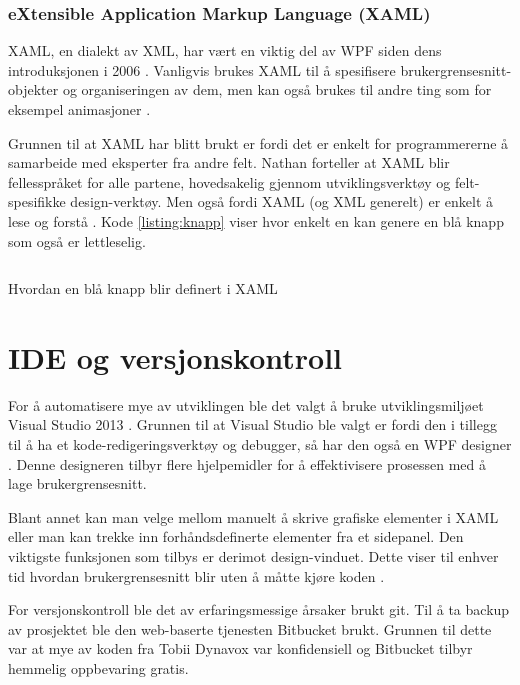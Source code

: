 \subsubsection{eXtensible Application Markup Language (XAML)} 

XAML, en dialekt av XML, har vært en viktig del av WPF siden dens introduksjonen i 2006 \cite[p.~17]{WPFbook}. Vanligvis brukes XAML til å spesifisere brukergrensesnitt-objekter og organiseringen av dem, men kan også brukes til andre ting som for eksempel animasjoner \cite{Story5:online}. 

Grunnen til at XAML har blitt brukt er fordi det er enkelt for programmererne å samarbeide med eksperter fra andre felt. Nathan forteller at XAML blir fellesspråket for alle partene, hovedsakelig gjennom utviklingsverktøy og felt-spesifikke design-verktøy. Men også fordi XAML (og XML generelt) er enkelt å lese og forstå \cite[p.~17]{WPFbook}. Kode \ref{listing:knapp} viser hvor enkelt en kan genere en blå knapp som også er lettleselig.


\begin{listing}[ht] 
\inputminted[fontsize=\footnotesize, frame=lines,framesep=2mm,baselinestretch=1.2,bgcolor=lightgray,linenos]{xml}{Code/xamlexample.xml} 
\caption{Hvordan en blå knapp blir definert i XAML} 
\label{listing:knapp} 
\end{listing} 
 
   
\section{IDE og versjonskontroll} 

For å automatisere mye av utviklingen ble det valgt å bruke utviklingsmiljøet Visual Studio 2013 \cite{2013-1:online}. Grunnen til at Visual Studio ble valgt er fordi den i tillegg til å ha et kode-redigeringsverktøy og debugger, så har den også en WPF designer \cite{What8:online}. Denne designeren tilbyr flere hjelpemidler for å effektivisere prosessen med å lage brukergrensesnitt. 

Blant annet kan man velge mellom manuelt å skrive grafiske elementer i XAML eller man kan trekke inn forhåndsdefinerte elementer fra et sidepanel. Den viktigste funksjonen som tilbys er derimot design-vinduet. Dette viser til enhver tid hvordan brukergrensesnitt blir uten å måtte kjøre koden \cite{WPFD1:online}. 
 
For versjonskontroll ble det av erfaringsmessige årsaker brukt git\cite{AboutGit:online}. Til å ta backup av prosjektet ble den web-baserte tjenesten Bitbucket brukt. Grunnen til dette var at mye av koden fra Tobii Dynavox var konfidensiell og Bitbucket tilbyr hemmelig oppbevaring gratis. 
 
